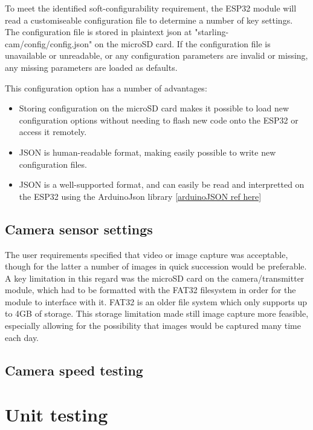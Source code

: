 To meet the identified soft-configurability requirement, the ESP32 module will read a customiseable configuration file to determine a number of key settings. The configuration file is stored in plaintext json at "starling-cam/config/config.json" on the microSD card. If the configuration file is unavailable or unreadable, or any configuration parameters are invalid or missing, any missing parameters are loaded as defaults.

This configuration option has a number of advantages:

\begin{itemize}
    \item Storing configuration on the microSD card makes it possible to load new configuration options without needing to flash new code onto the ESP32 or access it remotely.
    \item JSON is human-readable format, making easily possible to write new configuration files.
    \item JSON is a well-supported format, and can easily be read and interpretted on the ESP32 using the ArduinoJson library \ref{arduinoJSON ref here}
\end{itemize}

\subsection{Camera sensor settings}

The user requirements specified that video or image capture was acceptable, though for the latter a number of images in quick succession would be preferable. A key limitation in this regard was the microSD card on the camera/transmitter module, which had to be formatted with the FAT32 filesystem in order for the module to interface with it. FAT32 is an older file system which only supports up to 4GB of storage. This storage limitation made still image capture more feasible, especially allowing for the possibility that images would be captured many time each day.



\subsection{Camera speed testing}


\section{Unit testing \label{s:firmware-unit-tests}}

